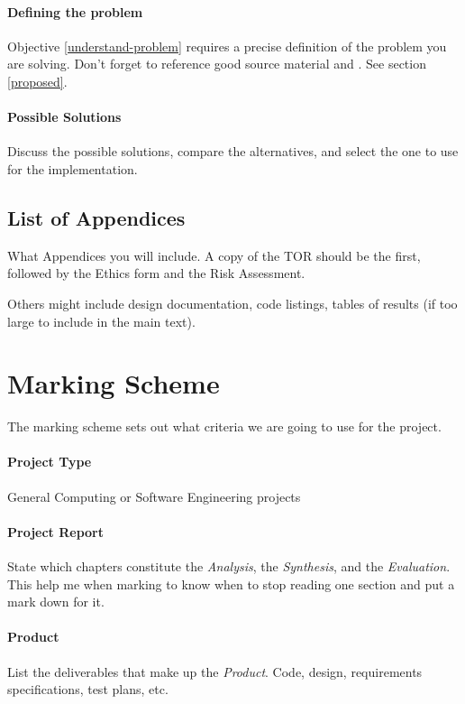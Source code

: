 \paragraph{Defining the problem}  Objective \ref{understand-problem} requires a precise definition of the problem you are solving.  Don't forget to reference good source material \citep{henning_schulzrinne} and \citep{talbot2013}.  See section \ref{proposed}.

\paragraph{Possible Solutions} Discuss the possible solutions, compare the
alternatives, and select the one to use for the  implementation.

\subsection{List of Appendices}
What Appendices you will include.  A copy of the TOR should be the first, followed by the Ethics form and the Risk Assessment.

Others might include design documentation, code listings, tables of results (if too large to include in the main text).

\section{Marking Scheme}
The marking scheme sets out what criteria we are going to use for the project.

\paragraph{Project Type} General Computing or Software Engineering projects

\paragraph{Project Report}  State which chapters constitute the \emph{Analysis}, the \emph{Synthesis}, and the \emph{Evaluation}.  This help me when marking to know when to stop reading one section and put a mark down for it.

\paragraph{Product}  List the deliverables that make up the \emph{Product}.  Code, design, requirements specifications, test plans, etc.

